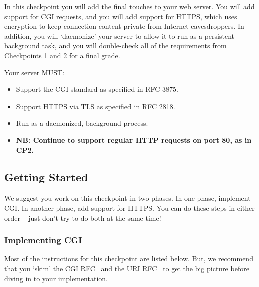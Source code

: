 \label{sec:cp3}
In this checkpoint you will add the final touches to your web server. 
You will add support for CGI requests, and you will add support for HTTPS, which uses encryption to keep connection content private from Internet eavesdroppers.
In addition, you will `daemonize' your server to allow it to run as a persistent background task, and you will double-check all of the requirements from Checkpoints 1 and 2 for a final grade.

\vspace{5pt}
\noindent Your server MUST:
\begin{itemize}
  \item Support the CGI standard as specified in RFC 3875.
  \item Support HTTPS via TLS as specified in RFC 2818.
  \item Run as a daemonized, background process.
  \item {\bf NB: Continue to support regular HTTP requests on port 80, as in CP2.}
\end{itemize}

\subsection{Getting Started}
We suggest you work on this checkpoint in two phases. In one phase, implement CGI. In another phase, add support for HTTPS. You can do these steps in either order -- just don't try to do both at the same time!

\subsubsection{Implementing CGI}

  Most of the instructions for this checkpoint are listed below. But, we recommend that you `skim' the CGI RFC~\cite{cgirfc} and the URI RFC~\cite{urirfc} to get the big picture before diving in to your implementation.

